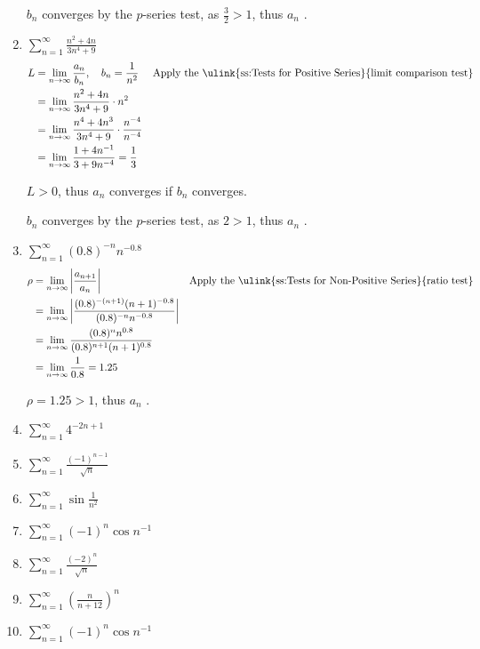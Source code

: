 \begin{enumerate}[itemsep=12em]
    \(b_n\) converges by the \(p\)-series test, as \(\frac{3}{2} > 1\), thus
    \(a_n\) .


  \item \(\displaystyle \sum_{n=1}^{\infty} \frac{n^2 + 4n}{3n^4 + 9} \)
    \begin{align*}
      L &= \lim_{n \to \infty} \frac{a_n}{b_n}, \quad b_n = \frac{1}{n^2}
      && \text{Apply the \ulink{ss:Tests for Positive Series}{limit comparison test}} \\
      &= \lim_{n \to \infty} \frac{n^2 + 4n}{3n^4 + 9} \cdot n^2 \\
      &= \lim_{n \to \infty} \frac{n^4 + 4n^3}{3n^4 + 9} \cdot \frac{n^{-4}}{n^{-4}} \\
      &= \lim_{n \to \infty} \frac{1 + 4n^{-1}}{3 + 9n^{-4}} = \frac{1}{3}
    \end{align*}

    \(L > 0\), thus \(a_n\) converges if \(b_n\) converges.

    \(b_n\) converges by the \(p\)-series test, as \(2 > 1\), thus
    \(a_n\) .

  \item \(\displaystyle \sum_{n=1}^{\infty} (0.8)^{-n} n^{-0.8}  \)
    \begin{align*}
      \rho &= \lim_{n \to \infty} \left| \frac{a_{n+1}}{a_n}  \right|
     && \text{Apply the \ulink{ss:Tests for Non-Positive Series}{ratio test}} \\
     &= \lim_{n \to \infty}
     \left|  \frac{(0.8)^{-(n+1)} (n+1)^{-0.8}}{(0.8)^{-n} n^{-0.8}} \right| \\
     &= \lim_{n \to \infty}  \frac{(0.8)^{n} n^{0.8}}{(0.8)^{n+1} (n+1)^{0.8}} \\
     &= \lim_{n \to \infty}  \frac{1}{0.8} = 1.25
    \end{align*}

    \(\rho = 1.25 > 1 \), thus \(a_n\) .

  \item \(\displaystyle \sum_{n=1}^{\infty} 4^{-2n+1}  \)

  \item \(\displaystyle \sum_{n=1}^{\infty} \frac{(-1)^{n-1}}{\sqrt{n} }  \)

  \item \(\displaystyle \sum_{n=1}^{\infty} \sin \frac{1}{n^2}  \)

  \item \(\displaystyle \sum_{n=1}^{\infty} (-1)^n \cos n^{-1} \)

  \item \(\displaystyle \sum_{n=1}^{\infty} \frac{(-2)^n}{\sqrt{n} } \)

  \item \(\displaystyle \sum_{n=1}^{\infty} \left( \frac{n}{n+12} \right)^n \)

  \item \(\displaystyle \sum_{n=1}^{\infty} (-1)^n \cos n^{-1} \)


\end{enumerate}

